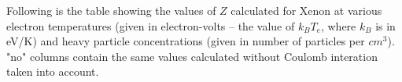 \documentclass[english,12pt]{revtex4}
\begin{document}
Following is the table showing the values of $Z$ calculated for Xenon
at various electron temperatures
(given in electron-volts -- the value of $k_{B}T_{e}$, where $k_{B}$
is in eV/K) and heavy particle concentrations (given in number of
particles per $cm^{3}$). "no" columns contain the same values
calculated without Coulomb interation taken into account.

\begin{center}

\par\end{center}


%
%


\end{document}
